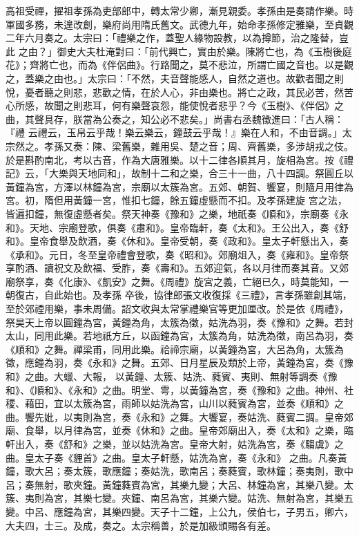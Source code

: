 \begin{pinyinscope}
 高祖受禪，擢祖孝孫為吏部郎中，轉太常少卿，漸見親委。孝孫由是奏請作樂。時軍國多務，未遑改創，樂府尚用隋氏舊文。武德九年，始命孝孫修定雅樂，至貞觀二年六月奏之。太宗曰：「禮樂之作，蓋聖人緣物設教，以為撙節，治之隆替，豈此
 之由？」御史大夫杜淹對曰：「前代興亡，實由於樂。陳將亡也，為《玉樹後庭花》；齊將亡也，而為《伴侶曲》。行路聞之，莫不悲泣，所謂亡國之音也。以是觀之，蓋樂之由也。」太宗曰：「不然，夫音聲能感人，自然之道也。故歡者聞之則悅，憂者聽之則悲，悲歡之情，在於人心，非由樂也。將亡之政，其民必苦，然苦心所感，故聞之則悲耳，何有樂聲哀怨，能使悅者悲乎？今《玉樹》、《伴侶》之曲，其聲具存，朕當為公奏之，知公必不悲矣。」尚書右丞魏徵進曰：「古人稱：『禮
 云禮云，玉帛云乎哉！樂云樂云，鐘鼓云乎哉！』樂在人和，不由音調。」太宗然之。孝孫又奏：陳、梁舊樂，雜用吳、楚之音；周、齊舊樂，多涉胡戎之伎。於是斟酌南北，考以古音，作為大唐雅樂。以十二律各順其月，旋相為宮。按《禮記》云，「大樂與天地同和」，故制十二和之樂，合三十一曲，八十四調。祭圓丘以黃鐘為宮，方澤以林鐘為宮，宗廟以太簇為宮。五郊、朝賀、饗宴，則隨月用律為宮。初，隋但用黃鐘一宮，惟扣七鐘，餘五鐘虛懸而不扣。及孝孫建旋
 宮之法，皆遍扣鐘，無復虛懸者矣。祭天神奏《豫和》之樂，地祇奏《順和》，宗廟奏《永和》。天地、宗廟登歌，俱奏《肅和》。皇帝臨軒，奏《太和》。王公出入，奏《舒和》。皇帝食舉及飲酒，奏《休和》。皇帝受朝，奏《政和》。皇太子軒懸出入，奏《承和》。元日，冬至皇帝禮會登歌，奏《昭和》。郊廟俎入，奏《雍和》。皇帝祭享酌酒、讀祝文及飲福、受胙，奏《壽和》。五郊迎氣，各以月律而奏其音。又郊廟祭享，奏《化康》、《凱安》之舞。《周禮》旋宮之義，亡絕已久，時莫能知，一朝復古，自此始也。及孝孫
 卒後，協律郎張文收復採《三禮》，言孝孫雖創其端，至於郊禋用樂，事未周備。詔文收與太常掌禮樂官等更加厘改。於是依《周禮》，祭昊天上帝以圓鐘為宮，黃鐘為角，太簇為徵，姑洗為羽，奏《豫和》之舞。若封太山，同用此樂。若地祇方丘，以函鐘為宮，太簇為角，姑洗為徵，南呂為羽，奏《順和》之舞。禪梁甫，同用此樂。祫禘宗廟，以黃鐘為宮，大呂為角，太簇為徵，應鐘為羽，奏《永和》之舞。五郊、日月星辰及類於上帝，黃鐘為宮，奏《豫和》之曲。大蠟、大報，
 以黃鐘、太簇、姑洗、蕤賓、夷則、無射等調奏《豫和》、《順和》、《永和》之曲。明堂、雩，以黃鐘為宮，奏《豫和》之曲。神州、社稷、藉田，宜以太簇為宮，雨師以姑洗為宮，山川以蕤賓為宮，並奏《順和》之曲。饗先妣，以夷則為宮，奏《永和》之舞。大饗宴，奏姑洗、蕤賓二調。皇帝郊廟、食舉，以月律為宮，並奏《休和》之曲。皇帝郊廟出入，奏《太和》之樂，臨軒出入，奏《舒和》之樂，並以姑洗為宮。皇帝大射，姑洗為宮，奏《騶虞》之曲。皇太子奏《貍首》之曲。皇太子軒懸，姑洗為宮，奏《永和》
 之曲。凡奏黃鐘，歌大呂；奏太簇，歌應鐘；奏姑洗，歌南呂；奏蕤賓，歌林鐘；奏夷則，歌中呂；奏無射，歌夾鐘。黃鐘蕤賓為宮，其樂九變；大呂、林鐘為宮，其樂八變。太簇、夷則為宮，其樂七變。夾鐘、南呂為宮，其樂六變。姑洗、無射為宮，其樂五變。中呂、應鐘為宮，其樂四變。天子十二鐘，上公九，侯伯七，子男五，卿六，大夫四，士三。及成，奏之。太宗稱善，於是加級頒賜各有差。




\end{pinyinscope}
